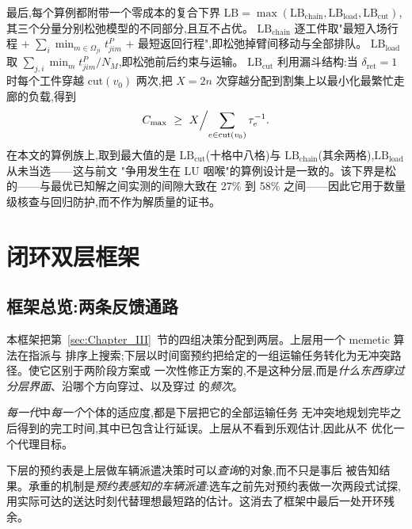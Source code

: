 \documentclass[manuscript,screen,review]{acmart}
\newcommand{\LBGapLo}{27\%}
\newcommand{\LBGapHi}{58\%}
\begin{document}
最后,每个算例都附带一个零成本的复合下界
$\mathrm{LB}=\max(\mathrm{LB}_{\text{chain}},\mathrm{LB}_{\text{load}},
\mathrm{LB}_{\text{cut}})$,其三个分量分别松弛模型的不同部分,且互不占优。
$\mathrm{LB}_{\text{chain}}$ 逐工件取"最短入场行程 $+$
$\sum_i \min_{m\in\Omega_{ji}}t^P_{jim}$ $+$ 最短返回行程",即松弛掉臂间移动与全部排队。
$\mathrm{LB}_{\text{load}}$ 取 $\sum_{j,i}\min_m t^P_{jim}/N_M$,即松弛前后约束与运输。
$\mathrm{LB}_{\text{cut}}$ 利用漏斗结构:当 $\delta_{\mathrm{ret}}=1$ 时每个工件穿越
$\mathrm{cut}(v_0)$ 两次,把 $X=2n$ 次穿越分配到割集上以最小化最繁忙走廊的负载,得到
\begin{equation}
\label{eq:lbcut}
C_{\max}\ \ge\ X\Bigl/\sum_{e\in \mathrm{cut}(v_0)}\tau_e^{-1}.
\end{equation}
在本文的算例族上,取到最大值的是 $\mathrm{LB}_{\text{cut}}$(十格中八格)与
$\mathrm{LB}_{\text{chain}}$(其余两格),$\mathrm{LB}_{\text{load}}$ 从未当选——这与前文
"争用发生在 LU 咽喉"的算例设计是一致的。该下界是松的——与最优已知解之间实测的间隙大致在
\LBGapLo{} 到 \LBGapHi{} 之间——因此它用于数量级核查与回归防护,而不作为解质量的证书。

\section{闭环双层框架}
\label{sec:Chapter_IV}
\subsection{框架总览:两条反馈通路}
\label{sec:overview}

本框架把第~\ref{sec:Chapter_III}~节的四组决策分配到两层。上层用一个 memetic 算法在指派与
排序上搜索;下层以时间窗预约把给定的一组运输任务转化为无冲突路径。使它区别于两阶段方案或
一次性修正方案的,不是这种分层,而是\emph{什么东西穿过分层界面}、沿哪个方向穿过、以及穿过
的\emph{频次}。

\begin{description}[leftmargin=0pt,topsep=3pt,itemsep=3pt]
\item[评价通路。] \emph{每一代}中\emph{每一个}个体的适应度,都是下层把它的全部运输任务
无冲突地规划完毕之后得到的完工时间,其中已包含让行延误。上层从不看到乐观估计,因此从不
优化一个代理目标。
\item[决策通路。] 下层的预约表是上层做车辆派遣决策时可以\emph{查询}的对象,而不只是事后
被告知结果。承重的机制是\emph{预约表感知的车辆派遣}:选车之前先对预约表做一次两段式试探,
用实际可达的送达时刻代替理想最短路的估计。这消去了框架中最后一处开环残余。
\end{description}
\end{document}
